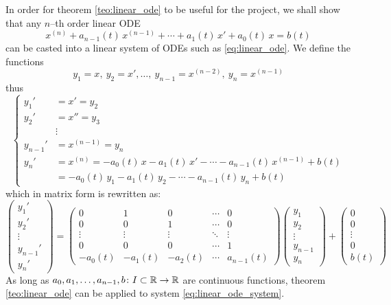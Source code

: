In order for theorem \ref{teo:linear_ode} to be useful for the project, we
shall show that any $n$--th order linear ODE
\begin{equation*}
	x^{(n)} + a_{n-1}(t) \, x^{(n-1)} + \cdots + a_1(t) \, x' + a_0(t) \, x = b(t) 
\end{equation*}
can be casted into a linear system of ODEs such as \eqref{eq:linear_ode}. We
define the functions
\begin{equation*}
	y_1 = x, \ y_2 = x', \ldots, \ y_{n-1} = x^{(n-2)}, \ y_n = x^{(n-1)}
\end{equation*}
thus
\begin{equation*}
	\left\{
		\begin{aligned}
			y_1' &= x' = y_2 \\
			y_2' &= x'' = y_3 \\
			&\vdots \\
			y_{n-1}' &= x^{(n-1)} = y_n \\
			y_n' &= x^{(n)} = -a_0(t) \, x - a_1(t) \, x' - \cdots - a_{n-1}(t) \, x^{(n-1)} + b(t) \\
			&= -a_0(t) \, y_1 - a_1(t) \, y_2 - \cdots - a_{n-1}(t) \, y_n + b(t)
		\end{aligned}
	\right.
\end{equation*}
which in matrix form is rewritten as:
\begin{equation} \label{eq:linear_ode_system}
	\begin{pmatrix}
		y_1' \\ y_2' \\ \vdots \\ y_{n-1}' \\ y_n'
	\end{pmatrix} = 
	\begin{pmatrix}
		0 & 1 & 0 & \cdots & 0 \\
		0 & 0 & 1 & \cdots & 0 \\
		\vdots & \vdots & \vdots & \ddots & \vdots \\
		0 & 0 & 0 & \cdots & 1 \\
		-a_0(t) & -a_1(t) & -a_2(t) & \cdots & a_{n-1}(t)
	\end{pmatrix}
	\begin{pmatrix}
		y_1 \\ y_2 \\ \vdots \\ y_{n-1} \\ y_n
	\end{pmatrix} + 
	\begin{pmatrix}
		0 \\ 0 \\ \vdots \\ 0 \\ b(t)
	\end{pmatrix}
\end{equation}
As long as $a_0, a_1, \ldots, a_{n-1}, b \colon I \subset \mathbb{R} \to \mathbb{R}$ are
continuous functions, theorem \ref{teo:linear_ode} can be applied to system
\eqref{eq:linear_ode_system}.


